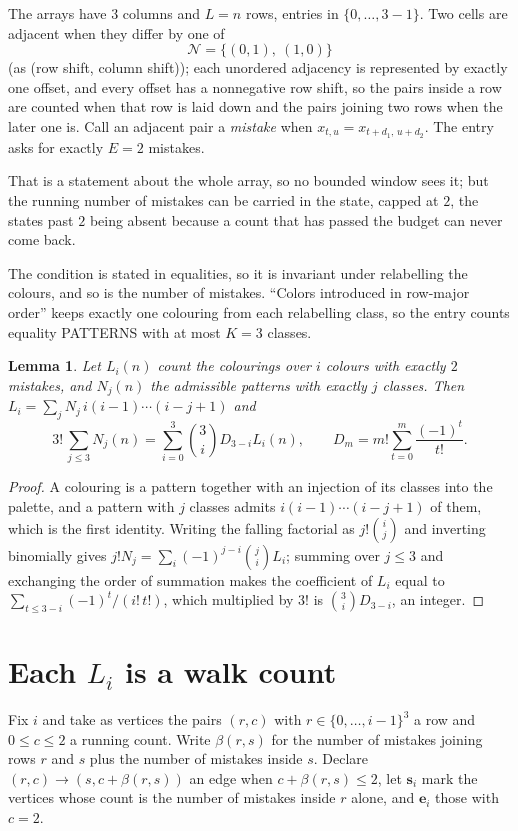 \documentclass[11pt,a4paper]{article}
\theoremstyle{plain}
\newtheorem{lemma}[theorem]{Lemma}
\theoremstyle{definition}
\begin{document}
The arrays have $3$ columns and $L=n$ rows, entries in $\{0,\dots,3-1\}$.
Two cells are adjacent when they differ by one of
\[
\mathcal N=\{(0,1),\ (1,0)\}
\]
(as (row shift, column shift)); each unordered adjacency is represented by exactly one
offset, and every offset has a nonnegative row shift, so the pairs inside a row are
counted when that row is laid down and the pairs joining two rows when the later one
is. Call an adjacent pair a \emph{mistake} when $x_{t,u}=x_{t+d_1,\,u+d_2}$. The entry asks for exactly
$E=2$ mistakes.

That is a statement about the whole array, so no bounded window sees it; but the running
number of mistakes can be carried in the state, capped at $2$, the states past $2$ being
absent because a count that has passed the budget can never come back.

The condition is stated in equalities, so it is invariant under relabelling the colours, and
so is the number of mistakes. ``Colors introduced in row-major order'' keeps exactly one
colouring from each relabelling class, so the entry counts equality PATTERNS with at most
$K=3$ classes.

\begin{lemma}\label{lem:inv}
Let $L_i(n)$ count the colourings over $i$ colours with exactly $2$ mistakes, and $N_j(n)$
the admissible patterns with exactly $j$ classes. Then
$L_i=\sum_j N_j\,i(i-1)\cdots(i-j+1)$ and
\[
3!\,\sum_{j\le3}N_j(n)=\sum_{i=0}^{3}\binom{3}{i}D_{3-i}L_i(n),
\qquad D_m=m!\sum_{t=0}^{m}\frac{(-1)^t}{t!} .
\]
\end{lemma}

\begin{proof}
A colouring is a pattern together with an injection of its classes into the palette, and a
pattern with $j$ classes admits $i(i-1)\cdots(i-j+1)$ of them, which is the first identity.
Writing the falling factorial as $j!\binom{i}{j}$ and inverting binomially gives
$j!N_j=\sum_i(-1)^{j-i}\binom{j}{i}L_i$; summing over $j\le3$ and exchanging the order
of summation makes the coefficient of $L_i$ equal to $\sum_{t\le3-i}(-1)^t/(i!\,t!)$,
which multiplied by $3!$ is $\binom{3}{i}D_{3-i}$, an integer.
\end{proof}

\section{Each $L_i$ is a walk count}

Fix $i$ and take as vertices the pairs $(r,c)$ with $r\in\{0,\dots,i-1\}^{3}$ a row
and $0\le c\le2$ a running count. Write $\beta(r,s)$ for the number of mistakes joining
rows $r$ and $s$ plus the number of mistakes inside $s$. Declare $(r,c)\to(s,c+\beta(r,s))$
an edge when $c+\beta(r,s)\le2$, let $\mathbf{s}_i$ mark the vertices whose count is the
number of mistakes inside $r$ alone, and $\mathbf{e}_i$ those with $c=2$.
\end{document}
